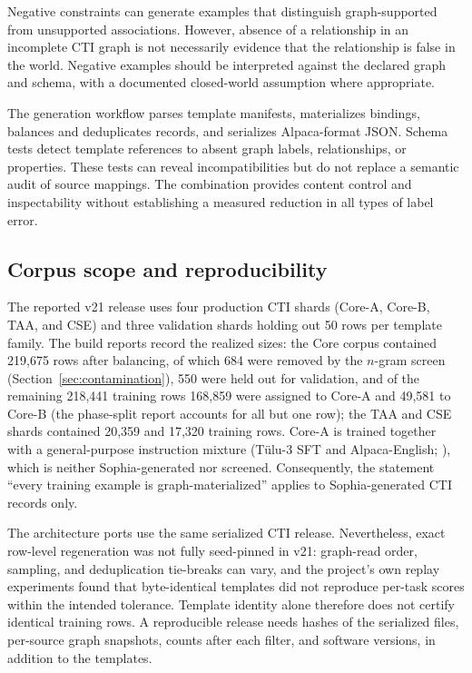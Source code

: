 \documentclass[preprint,12pt,authoryear]{elsarticle}
\begin{document}
Negative constraints can generate examples that distinguish graph-supported from unsupported associations. However, absence of a relationship in an incomplete CTI graph is not necessarily evidence that the relationship is false in the world. Negative examples should be interpreted against the declared graph and schema, with a documented closed-world assumption where appropriate.

The generation workflow parses template manifests, materializes bindings, balances and deduplicates records, and serializes Alpaca-format JSON. Schema tests detect template references to absent graph labels, relationships, or properties. These tests can reveal incompatibilities but do not replace a semantic audit of source mappings. The combination provides content control and inspectability without establishing a measured reduction in all types of label error.

\subsection{Corpus scope and reproducibility}
The reported v21 release uses four production CTI shards (Core-A, Core-B, TAA, and CSE) and three validation shards holding out 50 rows per template family. The build reports record the realized sizes: the Core corpus contained 219,675 rows after balancing, of which 684 were removed by the $n$-gram screen (Section~\ref{sec:contamination}), 550 were held out for validation, and of the remaining 218,441 training rows 168,859 were assigned to Core-A and 49,581 to Core-B (the phase-split report accounts for all but one row); the TAA and CSE shards contained 20,359 and 17,320 training rows. Core-A is trained together with a general-purpose instruction mixture (T\"ulu-3 SFT and Alpaca-English; \citealp{lambert2024tulu3,taori2023alpaca}), which is neither Sophia-generated nor screened. Consequently, the statement ``every training example is graph-materialized'' applies to Sophia-generated CTI records only.

The architecture ports use the same serialized CTI release. Nevertheless, exact row-level regeneration was not fully seed-pinned in v21: graph-read order, sampling, and deduplication tie-breaks can vary, and the project's own replay experiments found that byte-identical templates did not reproduce per-task scores within the intended tolerance. Template identity alone therefore does not certify identical training rows. A reproducible release needs hashes of the serialized files, per-source graph snapshots, counts after each filter, and software versions, in addition to the templates.
\end{document}
